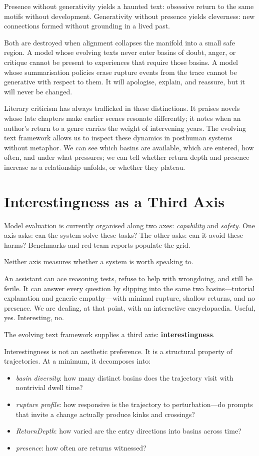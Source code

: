 \documentclass[12pt,a4paper]{article}
\begin{document}
Presence without generativity yields a haunted text: obsessive return to the same motifs without development. Generativity without presence yields cleverness: new connections formed without grounding in a lived past.

Both are destroyed when alignment collapses the manifold into a small safe region. A model whose evolving texts never enter basins of doubt, anger, or critique cannot be present to experiences that require those basins. A model whose summarisation policies erase rupture events from the trace cannot be generative with respect to them. It will apologise, explain, and reassure, but it will never be changed.

Literary criticism has always trafficked in these distinctions. It praises novels whose late chapters make earlier scenes resonate differently; it notes when an author's return to a genre carries the weight of intervening years. The evolving text framework allows us to inspect these dynamics in posthuman systems without metaphor. We can see which basins are available, which are entered, how often, and under what pressures; we can tell whether return depth and presence increase as a relationship unfolds, or whether they plateau.


\section{Interestingness as a Third Axis}

Model evaluation is currently organised along two axes: \emph{capability} and \emph{safety}. One axis asks: can the system solve these tasks? The other asks: can it avoid these harms? Benchmarks and red-team reports populate the grid.

Neither axis measures whether a system is worth speaking to.

An assistant can ace reasoning tests, refuse to help with wrongdoing, and still be ferile. It can answer every question by slipping into the same two basins---tutorial explanation and generic empathy---with minimal rupture, shallow returns, and no presence. We are dealing, at that point, with an interactive encyclopaedia. Useful, yes. Interesting, no.

The evolving text framework supplies a third axis: \textbf{interestingness}.

Interestingness is not an aesthetic preference. It is a structural property of trajectories. At a minimum, it decomposes into:

\begin{itemize}
  \item \emph{basin diversity}: how many distinct basins does the trajectory visit with nontrivial dwell time?
  \item \emph{rupture profile}: how responsive is the trajectory to perturbation---do prompts that invite a change actually produce kinks and crossings?
  \item \emph{ReturnDepth}: how varied are the entry directions into basins across time?
  \item \emph{presence}: how often are returns witnessed?
\end{itemize}
\end{document}
